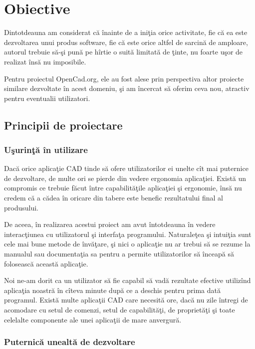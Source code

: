 \chapter{Obiective}

Dintotdeauna am considerat că înainte de a iniţia orice activitate, fie că ea
este dezvoltarea unui produs software, fie că este orice altfel de sarcină de
amploare, autorul trebuie să-şi pună pe hîrtie o suită limitată de ţinte, nu
foarte uşor de realizat însă nu imposibile.

Pentru proiectul OpenCad.org, ele au fost alese prin perspectiva altor proiecte
similare dezvoltate în acest domeniu, şi am încercat să oferim ceva nou,
atractiv pentru eventualii utilizatori.

\section{Principii de proiectare}

\subsection{Uşurinţă în utilizare}

Dacă orice aplicaţie CAD tinde să ofere utilizatorilor ei unelte cît mai
puternice de dezvoltare, de multe ori se pierde din vedere ergonomia aplicaţiei.
Există un compromis ce trebuie făcut între capabilităţile aplicaţiei şi
ergonomie, însă nu credem că a cădea în oricare din tabere este benefic
rezultatului final al produsului.

De aceea, în realizarea acestui proiect am avut întotdeauna în vedere
interacţiunea cu utilizatorul şi interfaţa programului. Naturaleţea şi intuiţia
sunt cele mai bune metode de învăţare, şi nici o aplicaţie nu ar trebui să se
rezume la manualul sau documentaţia sa pentru a permite utilizatorilor să
înceapă să folosească această aplicaţie.

Noi ne-am dorit ca un utilizator să fie capabil să vadă rezultate efective
utilizînd aplicaţia noastră în cîteva minute după ce a deschis pentru prima dată
programul. Există multe aplicaţii CAD care necesită ore, dacă nu zile întregi de
acomodare cu setul de comenzi, setul de capabilităţi, de proprietăţi şi toate
celelalte componente ale unei aplicaţii de mare anvergură.

\subsection{Puternică unealtă de dezvoltare}

